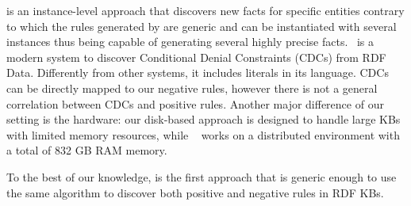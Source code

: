 
\cite{abedjan2014amending} is an instance-level approach that discovers new facts for specific entities contrary to which the rules generated by \krd are 
generic and can be instantiated with several instances thus being capable of generating several highly precise facts.~\cite{DBLP:conf/sigmod/FaridRIHC16} is a modern system to discover Conditional Denial Constraints (CDCs) from RDF Data. Differently from other systems, it includes literals in its language. CDCs can be directly mapped to our negative rules, however there is not a general correlation between CDCs and positive rules. Another major difference of
our setting is the hardware: our disk-based approach is designed to handle large KBs with limited memory resources, while ~\cite{DBLP:conf/sigmod/FaridRIHC16} works on a distributed environment with a total of 832 GB RAM memory.

To the best of our knowledge, \krd is the first approach that is generic enough to use the same algorithm to discover both positive and negative rules in RDF KBs.



